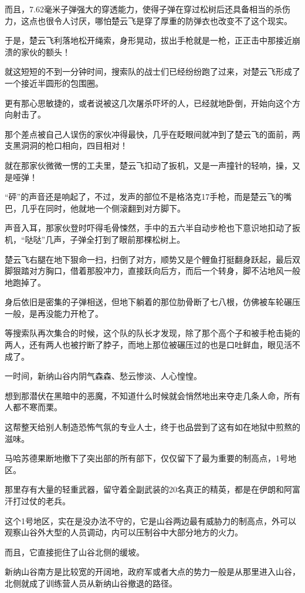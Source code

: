 而且，7.62毫米子弹强大的穿透能力，使得子弹在穿过松树后还具备相当的杀伤力，这点也很令人讨厌，哪怕楚云飞是穿了厚重的防弹衣也改变不了这个现实。

于是，楚云飞利落地松开绳索，身形晃动，拔出手枪就是一枪，正正击中那接近崩溃的家伙的额头！

就这短短的不到一分钟时间，搜索队的战士们已经纷纷跑了过来，对楚云飞形成了一个接近半圆形的包围圈。

更有那心思敏捷的，或者说被这几次屠杀吓坏的人，已经就地卧倒，开始向这个方向射击了。

那个差点被自己人误伤的家伙冲得最快，几乎在眨眼间就冲到了楚云飞的面前，两支黑洞洞的枪口相向，四目相对！

就在那家伙微微一愣的工夫里，楚云飞扣动了扳机，又是一声撞针的轻响，操，又是哑弹！

“砰”的声音还是响起了，不过，发声的部位不是格洛克17手枪，而是楚云飞的嘴巴，几乎在同时，他就地一个侧滚翻到对方脚下。

声音入耳，那家伙登时吓得毛骨悚然，手中的五六半自动步枪也下意识地扣动了扳机，“哒哒”几声，子弹全打到了眼前那棵松树上。

楚云飞右腿在地下狠命一扫，扫倒了对方，顺势又是个鲤鱼打挺翻身跃起，最后双脚狠踏对方胸口，借着那股冲力，直接跃向后方，而后一个转身，脚不沾地风一般地跑掉了。

身后依旧是密集的子弹相送，但地下躺着的那位肋骨断了七八根，仿佛被车轮碾压一般，是再没能力开枪了。

等搜索队再次集合的时候，这个队的队长才发现，除了那个高个子和被手枪击毙的两人，还有两人也被拧断了脖子，而地上那位被碾压过的也是口吐鲜血，眼见活不成了。

一时间，新纳山谷内阴气森森、愁云惨淡、人心惶惶。

想到那潜伏在黑暗中的恶魔，不知道什么时候就会悄然地出来夺走几条人命，所有人都不寒而栗。

这帮整天给别人制造恐怖气氛的专业人士，终于也品尝到了这有如在地狱中煎熬的滋味。

马哈苏德果断地撤下了突出部的所有部下，仅仅留下了最为重要的制高点，1号地区。

那里存有大量的轻重武器，留守着全副武装的20名真正的精英，都是在伊朗和阿富汗打过仗的老兵。

这个1号地区，实在是没办法不守的，它是山谷两边最有威胁力的制高点，外可以观察山谷外大型的人员调动，内可以压制谷中大部分地方的火力。

而且，它直接扼住了山谷北侧的缓坡。

新纳山谷南方是比较宽的开阔地，政府军或者大点的势力一般是从那里进入山谷，北侧就成了训练营人员从新纳山谷撤退的路径。


